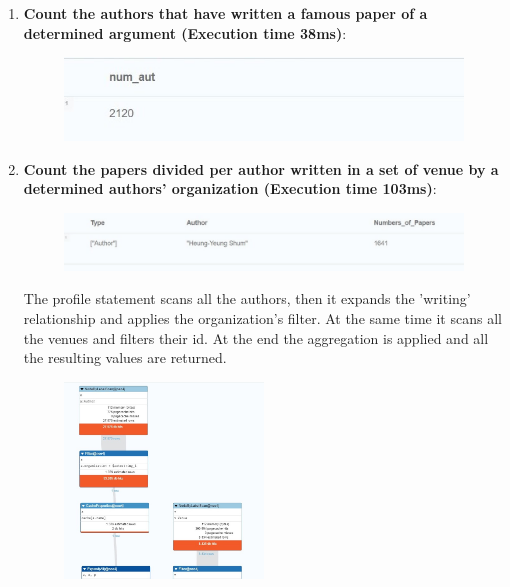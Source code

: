 \documentclass{Configuration_Files/PoliMi3i_thesis}
\begin{document}
\begin{enumerate}
\begin{figure}[H]
    \end{figure}
    \item \textbf{Count the authors that have written a famous paper of a determined argument (Execution time 38ms)}:
    \begin{figure}[H]
    \centering
    
    \end{figure}
    \begin{figure}[H]
    \centering
    \includegraphics[width=\textwidth]{Images/queries/query_4.jpg}
    \end{figure}
    \item \textbf{Count the papers divided per author written in a set of venue by a determined authors' organization (Execution time 103ms)}:
    
    \begin{figure}[H]
    \centering
    \includegraphics[width=\textwidth]{Images/queries/query_5.jpg}
    \end{figure}
  The profile statement scans all the authors, then it expands the 'writing' relationship and applies the organization's filter. At the same time it scans all the venues and filters their id. At the end the aggregation is applied and all the resulting values are returned.
    \begin{figure}[H]
    \centering
    \includegraphics[width=0.5\textwidth]{Images/queries/query_5_p1.jpg}

\end{figure}
\end{enumerate}
\end{document}
